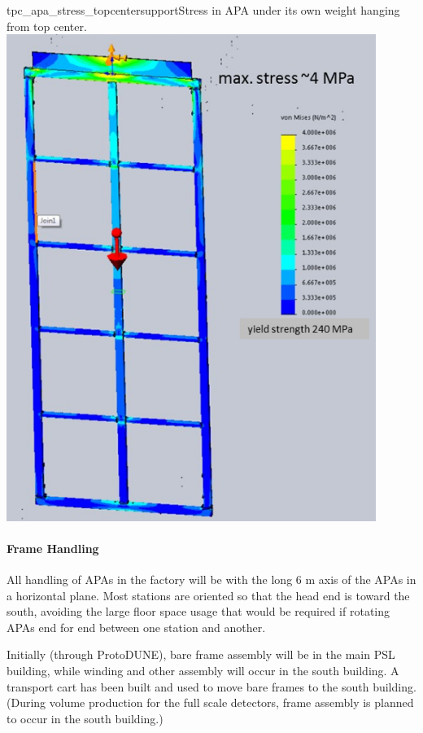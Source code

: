 \begin{cdrfigure}{tpc_apa_stress_topcentersupport}{Stress in APA under its own weight hanging from top center.}
\includegraphics[width=0.9\textwidth]{figures/tpc_apa_stress_topcentersupport.png} 
\end{cdrfigure}

\paragraph{Frame Handling}

All handling of APAs in the factory will be with the long 6 m axis of the APAs in a horizontal plane. Most stations are oriented so that the head end is toward the south, avoiding the large floor space usage that would be required if rotating APAs end for end between one station and another. 

Initially (through ProtoDUNE), bare frame assembly will be in the main PSL building, while winding and other assembly will occur in the south building. A transport cart has been built and used to move bare frames to the south building. (During volume production for the full scale detectors, frame assembly is planned to occur in the south building.)

